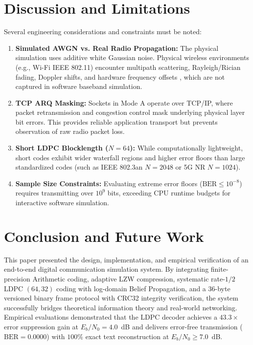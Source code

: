 \documentclass[conference]{IEEEtran}
\begin{document}
\section{Discussion and Limitations}
Several engineering considerations and constraints must be noted:
\begin{enumerate}
    \item \textbf{Simulated AWGN vs. Real Radio Propagation:} The physical simulation uses additive white Gaussian noise. Physical wireless environments (e.g., Wi-Fi IEEE 802.11) encounter multipath scattering, Rayleigh/Rician fading, Doppler shifts, and hardware frequency offsets \cite{tse2005}, which are not captured in software baseband simulation.
    \item \textbf{TCP ARQ Masking:} Sockets in Mode A operate over TCP/IP, where packet retransmission and congestion control mask underlying physical layer bit errors. This provides reliable application transport but prevents observation of raw radio packet loss.
    \item \textbf{Short LDPC Blocklength ($N=64$):} While computationally lightweight, short codes exhibit wider waterfall regions and higher error floors than large standardized codes (such as IEEE 802.3an $N=2048$ or 5G NR $N=1024$).
    \item \textbf{Sample Size Constraints:} Evaluating extreme error floors ($\text{BER} \le 10^{-8}$) requires transmitting over $10^9$ bits, exceeding CPU runtime budgets for interactive software simulation.
\end{enumerate}

\section{Conclusion and Future Work}
This paper presented the design, implementation, and empirical verification of an end-to-end digital communication simulation system. By integrating finite-precision Arithmetic coding, adaptive LZW compression, systematic rate-$1/2$ LDPC $(64, 32)$ coding with log-domain Belief Propagation, and a 36-byte versioned binary frame protocol with CRC32 integrity verification, the system successfully bridges theoretical information theory and real-world networking. Empirical evaluations demonstrated that the LDPC decoder achieves a $43.3\times$ error suppression gain at $E_b/N_0 = 4.0$~dB and delivers error-free transmission ($\text{BER} = 0.0000$) with $100\%$ exact text reconstruction at $E_b/N_0 \ge 7.0$~dB.
\end{document}
